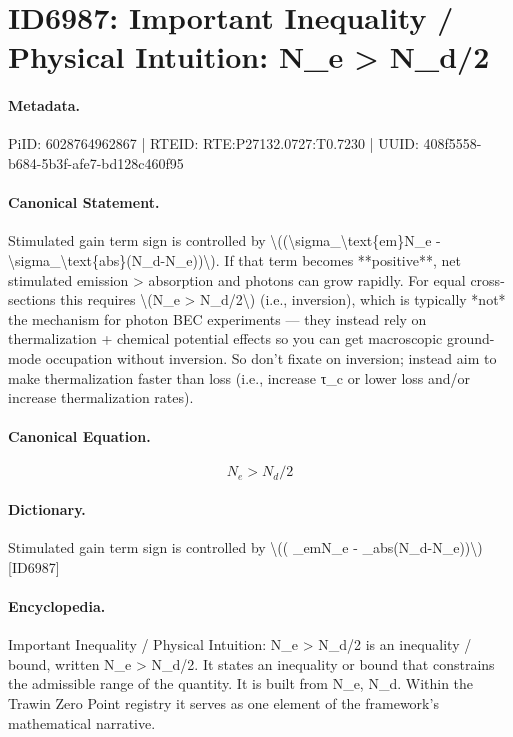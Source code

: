 \section*{ID6987: Important Inequality / Physical Intuition: N\_e > N\_d/2}
\paragraph{Metadata.}
PiID: 6028764962867 | RTEID: RTE:P27132.0727:T0.7230 | UUID: 408f5558-b684-5b3f-afe7-bd128c460f95

\paragraph{Canonical Statement.}
Stimulated gain term sign is controlled by \textbackslash{}((\textbackslash{}sigma\_\textbackslash{}text\{em\}N\_e - \textbackslash{}sigma\_\textbackslash{}text\{abs\}(N\_d-N\_e))\textbackslash{}). If that term becomes **positive**, net stimulated emission > absorption and photons can grow rapidly. For equal cross-sections this requires \textbackslash{}(N\_e > N\_d/2\textbackslash{}) (i.e., inversion), which is typically *not* the mechanism for photon BEC experiments — they instead rely on thermalization + chemical potential effects so you can get macroscopic ground-mode occupation without inversion. So don’t fixate on inversion; instead aim to make thermalization faster than loss (i.e., increase τ\_c or lower loss and/or increase thermalization rates).

\paragraph{Canonical Equation.}
\[
N_e > N_d/2
\]

\paragraph{Dictionary.}
Stimulated gain term sign is controlled by \textbackslash{}(( \_emN\_e - \_abs(N\_d-N\_e))\textbackslash{}) [ID6987]

\paragraph{Encyclopedia.}
Important Inequality / Physical Intuition: N\_e > N\_d/2 is an inequality / bound, written N\_e > N\_d/2. It states an inequality or bound that constrains the admissible range of the quantity. It is built from N\_e, N\_d. Within the Trawin Zero Point registry it serves as one element of the framework's mathematical narrative.

